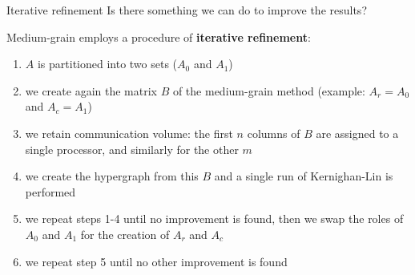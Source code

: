 \begin{frame}{Iterative refinement}
	Is there something we can do to improve the results?

	Medium-grain employs a procedure of \textbf{iterative refinement}:

	\begin{enumerate}
		\item $A$ is partitioned into two sets ($A_0$ and $A_1$)
		\item we create again the matrix $B$ of the medium-grain method (example: $A_r = A_0$ and $A_c = A_1$)
		\item we retain communication volume: the first $n$ columns of $B$ are assigned to a single processor, and similarly for the other $m$
		\item we create the hypergraph from this $B$ and a single run of Kernighan-Lin is performed
		\item we repeat steps 1-4 until no improvement is found, then we swap the roles of $A_0$ and $A_1$ for the creation of $A_r$ and $A_c$
		\item we repeat step 5 until no other improvement is found
	\end{enumerate}

\end{frame}

